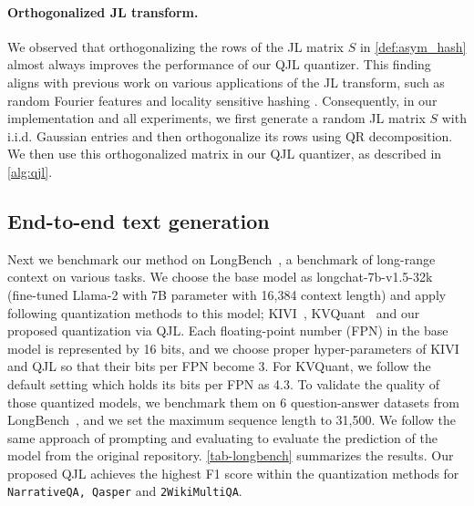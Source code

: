 \documentclass[11pt]{article}
\theoremstyle{plain}
\theoremstyle{definition}
\theoremstyle{remark}
\begin{document}
\paragraph{Orthogonalized JL transform.}
We observed that orthogonalizing the rows of the JL matrix $S$ in \cref{def:asym_hash} almost always improves the performance of our QJL quantizer.
This finding aligns with previous work on various applications of the JL transform, such as random Fourier features \cite{yu2016orthogonal} and locality sensitive hashing \cite{ji2012super}.
Consequently, in our implementation and all experiments, we first generate a random JL matrix $S$ with i.i.d. Gaussian entries and then orthogonalize its rows using QR decomposition. 
We then use this orthogonalized matrix in our QJL quantizer, as described in \cref{alg:qjl}.



\subsection{End-to-end text generation} \label{sec_exp_end2end}

Next we benchmark our method on LongBench~\cite{bai2023longbench}, a benchmark of long-range context on various tasks. 
We choose the base model as {longchat-7b-v1.5-32k}~\cite{longchat2023} (fine-tuned Llama-2 with 7B parameter with 16{,}384 context length) and apply following quantization methods to this model; KIVI~\cite{liu2024kivi}, KVQuant~\cite{yue2024wkvquant} and our proposed quantization via QJL. Each floating-point number (FPN) in the base model is represented by 16 bits, and we choose proper hyper-parameters of KIVI and QJL so that their bits per FPN become 3. For KVQuant, we follow the default setting which holds its bits per FPN as 4.3.
To validate the quality of those quantized models, we benchmark them on $6$ question-answer datasets from LongBench~\cite{bai2023longbench}, and we set the maximum sequence length to 31{,}500. We follow the same approach of prompting and evaluating to evaluate the prediction of the model from the original repository. \cref{tab-longbench} summarizes the results. Our proposed QJL achieves the highest F1 score within the quantization methods for \texttt{NarrativeQA, Qasper} and \texttt{2WikiMultiQA}.
\end{document}
